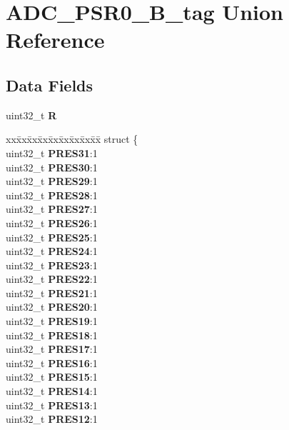 \hypertarget{unionADC__PSR0__32B__tag}{}\section{A\+D\+C\+\_\+\+P\+S\+R0\+\_\+B\+\_\+tag Union Reference}
\label{unionADC__PSR0__32B__tag}
\subsection*{Data Fields}
\begin{DoxyCompactItemize}
\item 
\mbox{\label{unionADC__PSR0__32B__tag_a48352b4c46ca75625b2e499cd2e3f725}} 
uint32\+\_\+t {\bfseries R}
\item 
\mbox{\label{unionADC__PSR0__32B__tag_a680c62b78ea4ca6ef4f9989bd580720f}} 
\begin{tabbing}
xx\=xx\=xx\=xx\=xx\=xx\=xx\=xx\=xx\=\kill
struct \{\\
\>uint32\_t {\bfseries PRES31}:1\\
\>uint32\_t {\bfseries PRES30}:1\\
\>uint32\_t {\bfseries PRES29}:1\\
\>uint32\_t {\bfseries PRES28}:1\\
\>uint32\_t {\bfseries PRES27}:1\\
\>uint32\_t {\bfseries PRES26}:1\\
\>uint32\_t {\bfseries PRES25}:1\\
\>uint32\_t {\bfseries PRES24}:1\\
\>uint32\_t {\bfseries PRES23}:1\\
\>uint32\_t {\bfseries PRES22}:1\\
\>uint32\_t {\bfseries PRES21}:1\\
\>uint32\_t {\bfseries PRES20}:1\\
\>uint32\_t {\bfseries PRES19}:1\\
\>uint32\_t {\bfseries PRES18}:1\\
\>uint32\_t {\bfseries PRES17}:1\\
\>uint32\_t {\bfseries PRES16}:1\\
\>uint32\_t {\bfseries PRES15}:1\\
\>uint32\_t {\bfseries PRES14}:1\\
\>uint32\_t {\bfseries PRES13}:1\\
\>uint32\_t {\bfseries PRES12}:1\\

\end{tabbing}
\end{DoxyCompactItemize}
